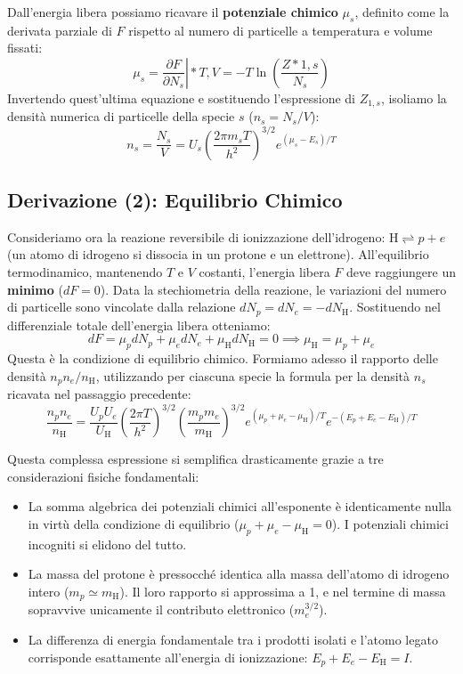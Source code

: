 Dall'energia libera possiamo ricavare il \textbf{potenziale chimico} $\mu_s$, definito come la derivata parziale di $F$ rispetto al numero di particelle a temperatura e volume fissati:
\begin{equation}
\mu_s = \left. \frac{\partial F}{\partial N_s} \right|*{T,V} = -T \ln \left( \frac{Z*{1,s}}{N_s} \right)
\end{equation}
Invertendo quest'ultima equazione e sostituendo l'espressione di $Z_{1,s}$, isoliamo la densità numerica di particelle della specie $s$ ($n_s = N_s/V$):
\begin{equation}
n_s = \frac{N_s}{V} = U_s \left( \frac{2\pi m_s T}{h^2} \right)^{3/2} e^{(\mu_s - E_s)/T}
\end{equation}

\subsection{Derivazione (2): Equilibrio Chimico}
Consideriamo ora la reazione reversibile di ionizzazione dell'idrogeno: $\text{H} \rightleftharpoons p + e$ (un atomo di idrogeno si dissocia in un protone e un elettrone).
All'equilibrio termodinamico, mantenendo $T$ e $V$ costanti, l'energia libera $F$ deve raggiungere un \textbf{minimo} ($dF = 0$). Data la stechiometria della reazione, le variazioni del numero di particelle sono vincolate dalla relazione $dN_p = dN_e = -dN_{\text{H}}$. Sostituendo nel differenziale totale dell'energia libera otteniamo:
\begin{equation}
dF = \mu_p dN_p + \mu_e dN_e + \mu_{\text{H}} dN_{\text{H}} = 0 \implies \mu_{\text{H}} = \mu_p + \mu_e
\end{equation}
Questa è la condizione di equilibrio chimico. Formiamo adesso il rapporto delle densità $n_p n_e / n_{\text{H}}$, utilizzando per ciascuna specie la formula per la densità $n_s$ ricavata nel passaggio precedente:
\begin{equation}
\frac{n_p n_e}{n_{\text{H}}} = \frac{U_p U_e}{U_{\text{H}}} \left( \frac{2\pi T}{h^2} \right)^{3/2} \left( \frac{m_p m_e}{m_{\text{H}}} \right)^{3/2} e^{(\mu_p + \mu_e - \mu_{\text{H}})/T} e^{-(E_p + E_e - E_{\text{H}})/T}
\end{equation}

Questa complessa espressione si semplifica drasticamente grazie a tre considerazioni fisiche fondamentali:
\begin{itemize}
\item La somma algebrica dei potenziali chimici all'esponente è identicamente nulla in virtù della condizione di equilibrio ($\mu_p + \mu_e - \mu_{\text{H}} = 0$). I potenziali chimici incogniti si elidono del tutto.
\item La massa del protone è pressocché identica alla massa dell'atomo di idrogeno intero ($m_p \simeq m_{\text{H}}$). Il loro rapporto si approssima a 1, e nel termine di massa sopravvive unicamente il contributo elettronico ($m_e^{3/2}$).
\item La differenza di energia fondamentale tra i prodotti isolati e l'atomo legato corrisponde esattamente all'energia di ionizzazione: $E_p + E_e - E_{\text{H}} = I$.
\end{itemize}

